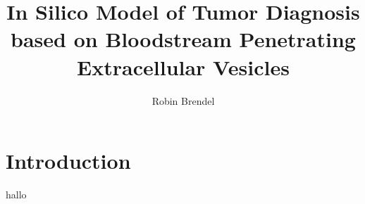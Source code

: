 \documentclass[sigconf]{acmart}
\begin{document}
\title{In Silico Model of Tumor Diagnosis based on Bloodstream Penetrating Extracellular Vesicles}
\author{Robin Brendel}

\begin{abstract}

\end{abstract}


\maketitle

\section{Introduction}
hallo



\end{document}
